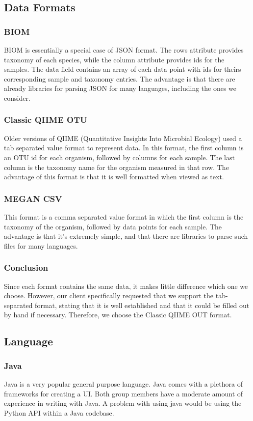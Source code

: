\documentclass[letterpaper,10pt, onecolumn, draftclsnofoot]{IEEEtran}
\begin{document}
\subsection{Data Formats}
\subsubsection{BIOM}
BIOM is essentially a special case of JSON format. The rows attribute provides taxonomy of each species, while the column attribute provides ids for the samples. The data field contains an array of each data point with ids for theirs corresponding sample and taxonomy entries. The advantage is that there are already libraries for parsing JSON for many languages, including the ones we consider.

\subsubsection{Classic QIIME OTU}
Older versions of QIIME (Quantitative Insights Into Microbial Ecology) used a tab separated value format to represent data. In this format, the first column is an OTU id for each organism, followed by columns for each sample. The last column is the taxonomy name for the organism measured in that row. The advantage of this format is that it is well formatted when viewed as text. 

\subsubsection{MEGAN CSV}
This format is a comma separated value format in which the first column is the taxonomy of the organism, followed by data points for each sample. The advantage is that it's extremely simple, and that there are libraries to parse such files for many languages.

\subsubsection{Conclusion}
Since each format contains the same data, it makes little difference which one we choose. However, our client specifically requested that we support the tab-separated format, stating that it is well established and that it could be filled out by hand if necessary. Therefore, we choose the Classic QIIME OUT format.
\subsection{Language}
\subsubsection{Java}
Java is a very popular general purpose language. Java comes with a plethora of frameworks for creating a UI. Both group members have a moderate amount of experience in writing with Java. A problem with using java would be using the Python API within a Java codebase.
\end{document}
